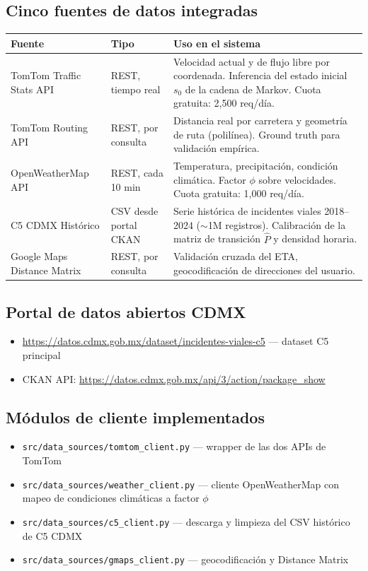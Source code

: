 \documentclass[11pt,a4paper]{article}
\begin{document}
\subsection{Cinco fuentes de datos integradas}
\begin{center}
\begin{tabularx}{\textwidth}{L{3.2cm} L{3cm} X}
\toprule
\textbf{Fuente} & \textbf{Tipo} & \textbf{Uso en el sistema} \\
\midrule
TomTom Traffic Stats API & REST, tiempo real & Velocidad actual y de flujo libre por coordenada. Inferencia del estado inicial $s_0$ de la cadena de Markov. Cuota gratuita: 2{,}500 req/día. \\
TomTom Routing API       & REST, por consulta & Distancia real por carretera y geometría de ruta (polilínea). Ground truth para validación empírica. \\
OpenWeatherMap API       & REST, cada 10 min  & Temperatura, precipitación, condición climática. Factor $\phi$ sobre velocidades. Cuota gratuita: 1{,}000 req/día. \\
C5 CDMX Histórico        & CSV desde portal CKAN & Serie histórica de incidentes viales 2018--2024 ($\sim$1M registros). Calibración de la matriz de transición $\hat{P}$ y densidad horaria. \\
Google Maps Distance Matrix & REST, por consulta & Validación cruzada del ETA, geocodificación de direcciones del usuario. \\
\bottomrule
\end{tabularx}
\end{center}

\subsection{Portal de datos abiertos CDMX}
\begin{itemize}
  \item \url{https://datos.cdmx.gob.mx/dataset/incidentes-viales-c5} --- dataset C5 principal
  \item CKAN API: \url{https://datos.cdmx.gob.mx/api/3/action/package_show}
\end{itemize}

\subsection{Módulos de cliente implementados}
\begin{itemize}
  \item \texttt{src/data\_sources/tomtom\_client.py} --- wrapper de las dos APIs de TomTom
  \item \texttt{src/data\_sources/weather\_client.py} --- cliente OpenWeatherMap con mapeo de condiciones climáticas a factor $\phi$
  \item \texttt{src/data\_sources/c5\_client.py} --- descarga y limpieza del CSV histórico de C5 CDMX
  \item \texttt{src/data\_sources/gmaps\_client.py} --- geocodificación y Distance Matrix
\end{itemize}
\end{document}
